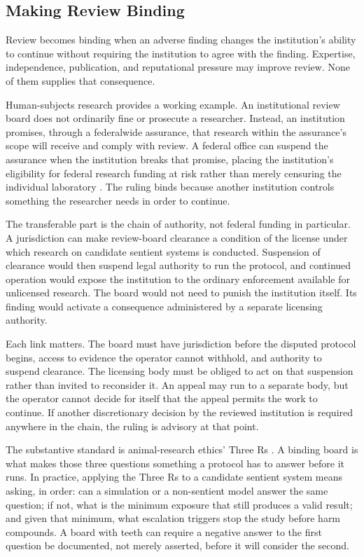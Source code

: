 \subsection{Making Review Binding}
\label{sec:making-binding}

Review becomes binding when an adverse finding changes the institution's
ability to continue without requiring the institution to agree with the
finding. Expertise, independence, publication, and reputational pressure
may improve review. None of them supplies that consequence.

Human-subjects research provides a working example. An institutional
review board does not ordinarily fine or prosecute a researcher.
Instead, an institution promises, through a federalwide assurance, that
research within the assurance's scope will receive and comply with
review. A federal office can suspend the assurance when the institution
breaks that promise, placing the institution's eligibility for federal
research funding at risk rather than merely censuring the individual
laboratory \autocite{ohrp2018fwa}. The ruling binds because another
institution controls something the researcher needs in order to
continue.

The transferable part is the chain of authority, not federal funding in
particular. A jurisdiction can make review-board clearance a condition
of the license under which research on candidate sentient systems is
conducted. Suspension of clearance would then suspend legal authority to
run the protocol, and continued operation would expose the institution
to the ordinary enforcement available for unlicensed research. The
board would not need to punish the institution itself. Its finding would
activate a consequence administered by a separate licensing authority.

Each link matters. The board must have jurisdiction before the disputed
protocol begins, access to evidence the operator cannot withhold, and
authority to suspend clearance. The licensing body must be obliged to
act on that suspension rather than invited to reconsider it. An appeal
may run to a separate body, but the operator cannot decide for itself
that the appeal permits the work to continue. If another discretionary
decision by the reviewed institution is required anywhere in the chain,
the ruling is advisory at that point.

The substantive standard is animal-research ethics' Three Rs \autocite{russell1959principles}. A binding board is what makes those three questions something a protocol has to answer before it runs. In practice, applying the Three Rs to a candidate sentient system means asking, in order: can a simulation or a non-sentient model answer the same question; if not, what is the minimum exposure that still produces a valid result; and given that minimum, what escalation triggers stop the study before harm compounds. A board with teeth can require a negative answer to the first question be documented, not merely asserted, before it will consider the second.

